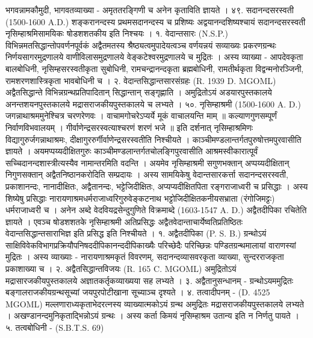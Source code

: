 भगवन्नामकौमुदी, भागवतव्याख्या - अमृततरङ्गिणी च अनेन कृताविति ज्ञायते ।
४९. सदानन्दसरस्वती (1500-1600 A.D.)
शङ्करानन्दस्य प्रथमसदानन्दस्य च प्रशिष्यः अद्वयानन्दशिष्यश्चायं सदानन्दसरस्वती नृसिम्हाश्रमिसामयिकः षोडशशतकीय इति निश्चयः ।
१. वेदान्तसारः (N.S.P.)
विभिन्नमतसिद्धान्तोपवर्णनपूर्वकं अद्वैतमतस्य श्रैष्ठ्यत्वमुपादेयत्वञ्च वर्णयन्नयं सव्याख्यः प्रकरणग्रन्थः निर्णयसागरमुद्रणालये वाणीविलासमुद्रणालये वेङ्कटेश्वरमुद्रणालये च मुद्रितः । अस्य व्याख्या - आपदेवकृता बालबोधिनी, नृसिम्हसरस्वतीकृता सुबोधिनी, रामचन्द्रानन्दकृता ब्रह्मबोधिनी, रामतीर्थकृता विद्वन्मनोरञ्जिनी, रामशरणशास्त्रिकृता भावबोधिनी च ।
२. वेदान्तसिद्धान्तसारसंग्रहः (R. 1939 D. MGOML)
अद्वैतसिद्धान्ते विभिन्नग्रन्थप्रतिपादितान् सिद्धान्तान् सङ्गृह्णाति । अमुद्रितोऽयं अडयारपुस्तकालये अनन्तशयनपुस्तकालये मद्रासराजकीयपुस्तकालये च लभ्यते ।
५०. नृसिम्हाश्रमी (1500-1600 A. D.)
जगन्नाथाश्रममुनेश्चित्र चरणरेणवः । वाचामगोचरेऽप्यर्ये मूकं वाचालयन्ति माम् ॥ कल्याणगुणसम्पूर्णं निर्वाणविभवालयम् । गीर्वाणेन्द्रसरस्वत्याश्चरणं शरणं भजे ॥
इति दर्शनात् नृसिम्हाश्रमिणः विद्यागुरुर्जगन्नाथाश्रमः, दीक्षागुररुर्गीर्वाणेन्द्रसरस्वतीति निश्चीयते । काञ्चीमण्डलान्तर्गतपुरुषोत्तमपुरवासीति ज्ञायते । अयमप्पय्यदीक्षितगुरुः काञ्चीमण्डलान्तर्गतचोलङ्गिपुरवासीति आश्रमस्वीकारात्पूर्वं सच्चिदानन्दशास्त्रीत्यस्यैव नामान्तरमिति वदन्ति । अयमेव नृसिम्हाश्रमी सगुणभक्तान् अप्पय्यदीक्षितान् निगुणसक्तान् अद्वैतनिष्ठानकरोदिति सम्प्रदायः ।
अस्य सामयिकेषु वेदान्तसारकर्त्ता सदानन्दसरस्वती, प्रकाशानन्दः, नानादीक्षितः, अद्वैतानन्दः, भट्टेजिदीक्षितः, अप्यप्यदीक्षितपिता रङ्गराजाध्वरी च प्रसिद्धाः । अस्य शिष्येषु प्रसिद्धाः नारायणाश्रमधर्मराजाध्वरिगुरुवेङ्कटनाथ भट्टोजिदीक्षितकनीयसभ्राता (रंगोजिमट्टः) धर्मराजाध्वरी च ।
अनेन अब्दे वेदवियद्रसेन्दुगुणिते विक्रमाब्दे (1603-1547 A. D.) अद्वैतदीपिका रचितेति ज्ञायते । एवञ्च षोडशशतके नृसिम्हाश्रमी अतिप्रसिद्धः अद्वैतवेदान्ताचार्येष्वतिप्रतिष्ठितः वेदान्तसिद्धान्तसाराभिज्ञ इति प्रसिद्ध इति निश्चीयते ।
१. अद्वैतदीपिका (P. S. B.)
ग्रन्थोऽयं साक्षिविवेकविभागप्रक्रियौपनिषददीपिकानन्ददीपिकाख्यैः परिच्छेदैः परिच्छिन्नः पण्डितग्रन्थमालायां वाराणस्यां मुद्रितः । अस्य व्याख्याः - नारायणाश्रमकृतं विवरणम्, सदानन्दव्यासवरकृता व्याख्या, सुन्दरराजकृता प्रकाशाख्या च ।
२. अद्वैतसिद्धान्तविजयः (R. 165 C. MGOML)
अमुद्रितोऽयं मद्रासारजकीयपुस्तकालये अज्ञातकर्तृकव्याख्यया सह लभ्यते ।
३. अद्वैतानुसन्धानम् - ग्रन्थोऽयममुद्रितः बङ्गालराजकीयग्रन्थसूच्यां जयपुरपोटीखाना सूच्याञ्च दृश्यते ।
४. तत्वादीपनम् - (D. 4525 MGOML)
मल्लणाराध्यकृताभेदरत्नस्य व्याख्यात्मकोऽयं ग्रन्थ अमुद्रितः मद्रासराजकीयपुस्तकालये लभ्यते । अखण्डानन्दमुनिकृताद्भिन्नोऽयं ग्रन्थः । अस्य कर्ता किमयं नृसिम्हाश्रम उतान्य इति न निर्णतु पायते ।
५. तत्वबोधिनी - (S.B.T.S. 69)
